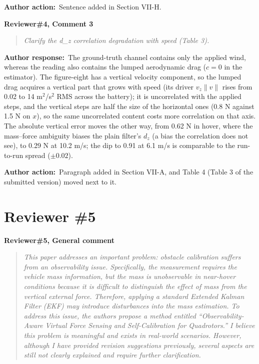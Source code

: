 \documentclass[11pt]{article}
\newcommand{\concern}[1]{\par\medskip\noindent\colorbox{gray!12}{\parbox{\dimexpr\linewidth-2\fboxsep}{\textbf{#1}}}\par\smallskip}
\newcommand{\rlabel}[1]{\par\textbf{#1}\ }
\begin{document}
\rlabel{Author action:}Sentence added in Section VII-H.

\concern{Reviewer\#4, Comment 3}

\begin{quote}\itshape Clarify the d\_z correlation degradation with speed (Table 3).\end{quote}

\rlabel{Author response:}The ground-truth channel contains only the applied wind, whereas the reading also contains the lumped aerodynamic drag ($c = 0$ in the estimator). The figure-eight has a vertical velocity component, so the lumped drag acquires a vertical part that grows with speed (its driver $v_z\|v\|$ rises from 0.02 to 14 m$^2$/s$^2$ RMS across the battery); it is uncorrelated with the applied steps, and the vertical steps are half the size of the horizontal ones (0.8 N against 1.5 N on $x$), so the same uncorrelated content costs more correlation on that axis. The absolute vertical error moves the other way, from 0.62 N in hover, where the mass--force ambiguity biases the plain filter's $d_z$ (a bias the correlation does not see), to 0.29 N at 10.2 m/s; the dip to 0.91 at 6.1 m/s is comparable to the run-to-run spread ($\pm 0.02$).

\rlabel{Author action:}Paragraph added in Section VII-A, and Table 4 (Table 3 of the submitted version) moved next to it.

\section*{Reviewer \#5}

\concern{Reviewer\#5, General comment}

\begin{quote}\itshape This paper addresses an important problem: obstacle calibration suffers from an observability issue. Specifically, the measurement requires the vehicle mass information, but the mass is unobservable in near-hover conditions because it is difficult to distinguish the effect of mass from the vertical external force. Therefore, applying a standard Extended Kalman Filter (EKF) may introduce disturbances into the mass estimation. To address this issue, the authors propose a method entitled ``Observability-Aware Virtual Force Sensing and Self-Calibration for Quadrotors.'' I believe this problem is meaningful and exists in real-world scenarios. However, although I have provided revision suggestions previously, several aspects are still not clearly explained and require further clarification.\end{quote}
\end{document}
